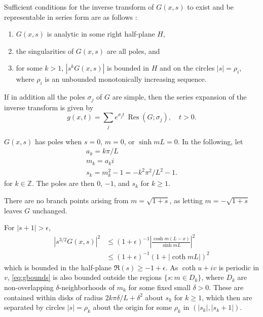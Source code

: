 \documentclass[parskip=half]{scrartcl}
\DeclareMathOperator{\Res}{Res}
\begin{document}
Sufficient conditions for the inverse transform of $G(x,s)$ to exist
and be representable in series form are as follows
\parencite[][Theorem 4]{churchill1937}:
\begin{enumerate}
\item
    $G(x, s)$ is analytic in some right half-plane $H$,
\item
    the singularities of $G(x, s)$ are all poles, and
\item for some $k>1$, $|s^k G(x, s)|$ is bounded in $H$ and
    on the circles $|s|=\rho_i$, where $\rho_i$ is an unbounded monotonically
    increasing sequence.
\end{enumerate}
If in addition all the poles $\sigma_j$ of $G$ are simple, then
the series expansion of the inverse transform is given by
\begin{equation}
    g(x,t) = \sum_j e^{\sigma_j t}\, \Res(G;\sigma_j),\quad t>0.
\end{equation}

$G(x,s)$ has poles when $s=0$, $m=0$, or $\sinh mL=0$.
In the following, let
\begin{gather*}
    a_k = k\pi /L\\
    m_k = a_k i\\
    s_k = m_k^2 -1 = -k^2\pi^2/L^2-1.
\end{gather*}
for $k\in\mathbb{Z}$.
The poles are then $0$, $-1$, and $s_k$ for $k\geq 1$.

There are no branch points
arising from $m=\sqrt{1+s}$, as letting $m=-\sqrt{1+s}$ leaves $G$ unchanged.

For $|s+1|>\epsilon$,
\begin{equation}
    \begin{aligned}
	|s^{3/2}G(x,s)|^2
	    & \leq (1+\epsilon)^{-1} \left| \frac{\cosh m(L-x)}{\sinh mL} \right|^2
	\\
	    & \leq (1+\epsilon)^{-1} (1+|\coth mL|)^2
    \label{eq:gbounds}
    \end{aligned}
\end{equation}
which is bounded in the half-plane $\Re(s) \geq  -1+\epsilon$. 
As $\coth u+iv$ is periodic in $v$, \eqref{eq:gbounds} is also bounded outside
the regions $\{s: m\in D_k\}$, where $D_k$ are non-overlapping $\delta$-neighborhoods of $m_k$
for some fixed small $\delta>0$. These are contained within disks of radius
$2k\pi\delta/L+\delta^2$ about $s_k$ for $k\geq 1$, which then are separated by
circles $|s|=\rho_k$ about the origin for some $\rho_k$ in $(|s_k|, |s_k+1|)$.
\end{document}
